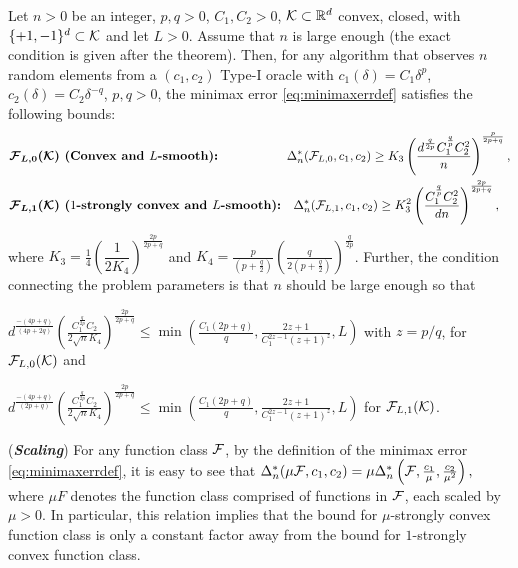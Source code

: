 \begin{theorem}
\label{thm:lb-convex}
Let $n>0$ be an integer, $p,q >0$, $C_1,C_2>0$,
$\mathcal{K}\subset \mathbb{R}^d$ convex, closed, with  $\{+1,-1\}^d\subset \mathcal{K}$ and let $L>0$.
Assume that $n$ is large enough (the exact condition is given after the theorem).
Then, for any algorithm that observes $n$ random elements from a $(c_1,c_2)$ Type-I oracle
 with $c_1(\delta) = C_1 \delta^p$, $c_2(\delta) = C_2 \delta^{-q}$, $p,q>0$,
 the minimax error \eqref{eq:minimaxerrdef} satisfies the following bounds:
 \vspace*{-0.1in}
\begin{align*}
&\textbf{$\bm{\mathcal{F}_{L,0}(\mathcal{K})}$ (Convex and $L$-smooth):} \hspace{5.5em} \Delta_n^{*}(\mathcal{F}_{L,0}, c_1,c_2) \ge K_3 \left(\dfrac{d^{\frac{q}{2p}}  C_1^{\frac{q}{p}} C_2^2}{ n}\right)^{\frac{p}{2p+q}},\\
&\textbf{$\bm{\mathcal{F}_{L,1}(\mathcal{K})}$ ($1$-strongly convex and $L$-smooth):} \hspace{1em}
\Delta_n^{*}(\mathcal{F}_{L,1}, c_1,c_2) \ge K_3^2  \left(\dfrac{C_1^{\frac{q}{p}} C_2^2 }{ {d n}}\right)^{\frac{2p}{2p+q}},
\end{align*}
where $K_3 = \frac{1}{4}\left(\dfrac{1}{2 K_4}\right)^{\frac{2p}{2p+q}}$ and $K_4 = \frac{p}{(p+\tfrac{q}{2})} \left(\frac{q}{2(p+\tfrac{q}{2})}\right)^{\frac{q}{2p}}$.
Further, the condition connecting the problem parameters is that $n$ should be large enough so that
\begin{inparaenum}[\bfseries (i)]
\item $d^{\frac{-(4p+q)}{(4p+2q)}}\left(\frac{ C_1^{\frac{q}{2p}} C_2 }{2\sqrt{n} K_4} \right)^{\frac{2p}{2p+q}}\le \min\left( \frac{C_1 (2p+q)}{q}, \frac{2z+1}{C_1^{2z-1}(z+1)^z},  L\right)$ with $z=p/q$, for $\mathcal{F}_{L,0}(\mathcal{K})$ and
\item $d^{\frac{-(4p+q)}{(2p+q)}}\left(\frac{ C_1^{\frac{q}{2p}} C_2}{2\sqrt{n} K_4} \right)^{\frac{2p}{2p+q}} \le \min\left( \frac{C_1 (2p+q)}{q}, \frac{2z+1}{C_1^{2z-1}(z+1)^z},  L\right)$  for $\mathcal{F}_{L,1}(\mathcal{K})$.
\end{inparaenum}
\end{theorem}
\begin{remark}(\textbf{\textit{Scaling}})
For any function class $\mathcal{F}$, by the definition of the minimax error \eqref{eq:minimaxerrdef}, it is easy to see that
$\Delta_n^*(\mu \mathcal{F}, c_1,c_2) = \mu \Delta_n^*\left(\mathcal{F}, \frac{c_1}{\mu},\frac{c_2}{\mu^2}\right),$
 where $\mu F$ denotes the function class comprised of functions in $\mathcal{F}$, each scaled by $\mu>0$. In particular, this relation implies that the bound for $\mu$-strongly convex function class is only a constant factor away from the bound for $1$-strongly convex function class.
\end{remark}
